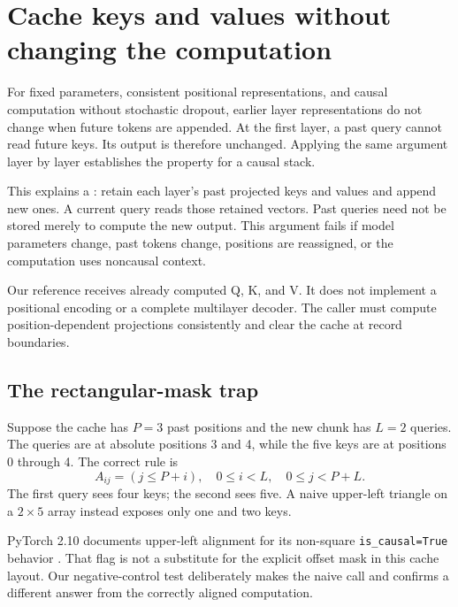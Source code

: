 \section{Cache keys and values without changing the computation}

For fixed parameters, consistent positional representations, and causal computation without stochastic dropout, earlier layer representations do not change when future tokens are appended. At the first layer, a past query cannot read future keys. Its output is therefore unchanged. Applying the same argument layer by layer establishes the property for a causal stack.

This explains a : retain each layer's past projected keys and values and append new ones. A current query reads those retained vectors. Past queries need not be stored merely to compute the new output. This argument fails if model parameters change, past tokens change, positions are reassigned, or the computation uses noncausal context.

Our reference receives already computed Q, K, and V. It does not implement a positional encoding or a complete multilayer decoder. The caller must compute position-dependent projections consistently and clear the cache at record boundaries.

\subsection{The rectangular-mask trap}

Suppose the cache has $P=3$ past positions and the new chunk has $L=2$ queries. The queries are at absolute positions 3 and 4, while the five keys are at positions 0 through 4. The correct rule is
\begin{equation}
A_{ij}=(j\leq P+i),\quad 0\leq i<L,\quad 0\leq j<P+L.
\label{eq:offset}
\end{equation}
The first query sees four keys; the second sees five. A naive upper-left triangle on a $2\times5$ array instead exposes only one and two keys.



PyTorch 2.10 documents upper-left alignment for its non-square \texttt{is\_causal=True} behavior \cite{sdpa}. That flag is not a substitute for the explicit offset mask in this cache layout. Our negative-control test deliberately makes the naive call and confirms a different answer from the correctly aligned computation.

